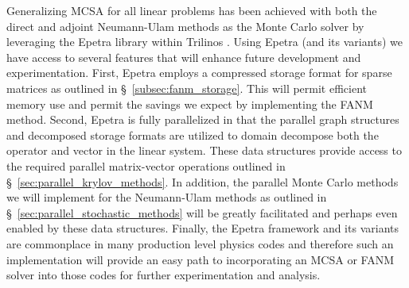 Generalizing MCSA for all linear problems has been achieved with both
the direct and adjoint Neumann-Ulam methods as the Monte Carlo solver
by leveraging the Epetra library within Trilinos
\citep{heroux_overview_2005}. Using Epetra (and its variants) we have
access to several features that will enhance future development and
experimentation. First, Epetra employs a compressed storage format for
sparse matrices as outlined in \S~\ref{subsec:fanm_storage}. This will
permit efficient memory use and permit the savings we expect by
implementing the FANM method. Second, Epetra is fully parallelized in
that the parallel graph structures and decomposed storage formats are
utilized to domain decompose both the operator and vector in the
linear system. These data structures provide access to the required
parallel matrix-vector operations outlined in
\S~\ref{sec:parallel_krylov_methods}. In addition, the parallel Monte
Carlo methods we will implement for the Neumann-Ulam methods as
outlined in \S~\ref{sec:parallel_stochastic_methods} will be greatly
facilitated and perhaps even enabled by these data
structures. Finally, the Epetra framework and its variants are
commonplace in many production level physics codes and therefore such
an implementation will provide an easy path to incorporating an MCSA
or FANM solver into those codes for further experimentation and
analysis.

